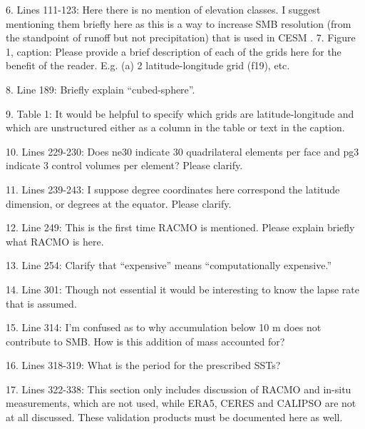 \documentclass[12pt,oneside,a4paper]{article}%
\begin{document}
6. Lines 111-123: Here there is no mention of elevation classes. I suggest mentioning them briefly here as this is a way to increase SMB resolution (from the standpoint of runoff but not precipitation) that is used in CESM  \newline
.
7. Figure 1, caption: Please provide a brief description of each of the grids here for the benefit of the reader. E.g. (a) 2 latitude-longitude grid (f19), etc.  \newline

8. Line 189: Briefly explain “cubed-sphere”.  \newline

9. Table 1: It would be helpful to specify which grids are latitude-longitude and which are unstructured either as a column in the table or text in the caption.  \newline

10. Lines 229-230: Does ne30 indicate 30 quadrilateral elements per face and pg3 indicate 3 control volumes per element? Please clarify. \newline

11. Lines 239-243: I suppose degree coordinates here correspond the latitude dimension, or degrees at the equator. Please clarify.  \newline

12. Line 249: This is the first time RACMO is mentioned. Please explain briefly what RACMO is here.  \newline

13. Line 254: Clarify that “expensive” means “computationally expensive.” \newline

14. Line 301: Though not essential it would be interesting to know the lapse rate that is assumed. \newline

15. Line 314: I’m confused as to why accumulation below 10 m does not contribute to SMB. How is this addition of mass accounted for? \newline

16. Lines 318-319: What is the period for the prescribed SSTs? \newline

17. Lines 322-338: This section only includes discussion of RACMO and in-situ measurements, which are not used, while ERA5, CERES and CALIPSO are not at all discussed. These validation products must be documented here as well. \newline
\end{document}
